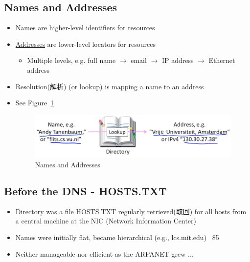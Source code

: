 \documentclass[12pt]{ctexart}   %
\begin{document}
	\subsection{Names and Addresses}
	\begin{itemize}
		\item \underline{Names} are higher-level identifiers for resources
		\item \underline{Addresses} are lower-level locators for resources
		\begin{itemize}
			\item Multiple levels, e.g. full name $\rightarrow$ email $\rightarrow$ IP address $\rightarrow$ Ethernet address
		\end{itemize}
		
		\item \underline{Resolution(解析)} (or lookup) is mapping a name to an address
		\item See Figure~\ref{fig:8-2-2}
		  
		 \begin{figure}[h!] %
		\centering
		 \includegraphics[scale=0.7]{images/8-2-2}
		\caption{ Names and Addresses }
		 \label{fig:8-2-2}
		 \end{figure}
	\end{itemize}
	
	\subsection{Before the DNS - HOSTS.TXT}
	\begin{itemize}
		\item Directory was a file HOSTS.TXT regularly retrieved(取回) for all hosts from a central machine at the NIC (Network Information Center)
		\item Names were initially flat, became hierarchical (e.g., lcs.mit.edu) ~85
		\item Neither manageable nor efficient as the ARPANET grew ...
	\end{itemize}
	
\end{document}
